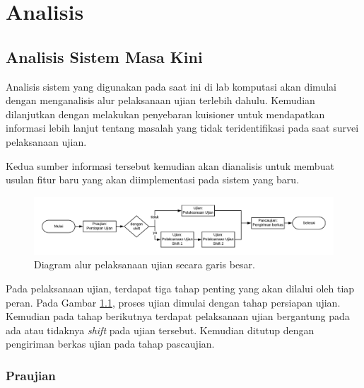 \chapter{Analisis}
\label{chap:analisis}

\section{Analisis Sistem Masa Kini}
    
    Analisis sistem yang digunakan pada saat ini di lab komputasi akan dimulai
    dengan menganalisis alur pelaksanaan ujian terlebih dahulu. Kemudian
    dilanjutkan dengan melakukan penyebaran kuisioner untuk mendapatkan
    informasi lebih lanjut tentang masalah yang tidak teridentifikasi pada saat
    survei pelaksanaan ujian.
    
    Kedua sumber informasi tersebut kemudian akan dianalisis untuk membuat
    usulan fitur baru yang akan diimplementasi pada sistem yang baru.


    \begin{figure}[H]
        \centering
        \includegraphics[width=0.75\paperwidth]{Gambar/flowchart/exam-flow-ujian.pdf}
        \caption{Diagram alur pelaksanaan ujian secara garis besar.}
        \label{fig:flowchart-exam-outline}
    \end{figure}
    
    Pada pelaksanaan ujian, terdapat tiga tahap penting yang
    akan dilalui oleh tiap peran. Pada Gambar \ref{fig:flowchart-exam-outline},
    proses ujian dimulai dengan tahap persiapan ujian. Kemudian pada tahap
    berikutnya terdapat pelaksanaan ujian bergantung pada ada atau tidaknya
    \textit{shift} pada ujian tersebut. Kemudian ditutup dengan pengiriman
    berkas ujian pada tahap pascaujian.
    
    \subsection{Praujian}
    
